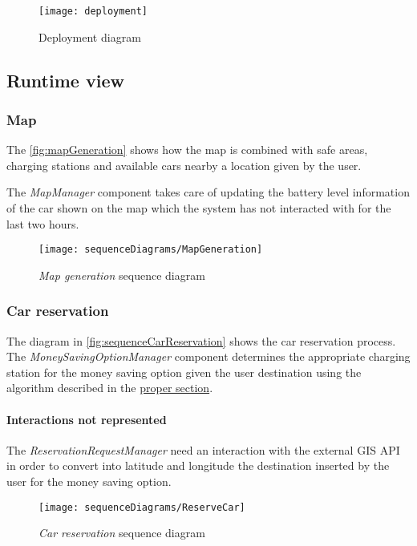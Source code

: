 \begin{figure}[h!]
	\centering
	\texttt{[image: deployment]}
	\caption{
		\label{fig:deployment} 
		Deployment diagram
	}
\end{figure}

\clearpage
\subsection{Runtime view}

\subsubsection{Map}
The \autoref{fig:mapGeneration} shows how the map is combined with safe areas, charging stations and available cars nearby a location given by the user.

The \emph{MapManager} component takes care of updating the battery level information of the car shown on the map which the system has not interacted with for the last two hours.

\begin{figure}[h!]
	\centering
	\texttt{[image: sequenceDiagrams/MapGeneration]}
	\caption{
		\label{fig:mapGeneration} 
		\emph{Map generation} sequence diagram
	}
\end{figure}

\clearpage
\subsubsection{Car reservation}
The diagram in \autoref{fig:sequenceCarReservation} shows the car reservation process.\\
The \mbox{\emph{MoneySavingOptionManager}} component determines the appropriate charging station for the money saving option given the user destination using the algorithm described in the \hyperref[sec:msoAlgorithm]{proper section}.

\paragraph{Interactions not represented}The \emph{ReservationRequestManager} need an interaction with the external GIS API in order to convert into latitude and longitude the destination inserted by the user for the money saving option.
\begin{figure}[h!]
	\centering
	\texttt{[image: sequenceDiagrams/ReserveCar]}
	\caption{
		\label{fig:sequenceCarReservation} 
		\emph{Car reservation} sequence diagram
	}
\end{figure}

